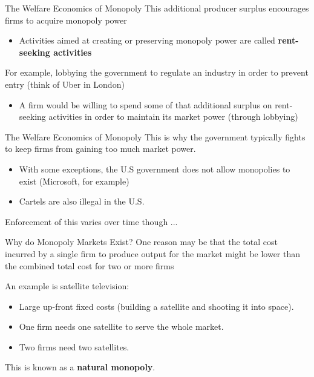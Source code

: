 \documentclass[11pt,t]{beamer}
\begin{document}
\begin{frame}{The Welfare Economics of Monopoly}
  This additional producer surplus encourages firms to acquire monopoly power

  \begin{itemize}
    \item Activities aimed at creating or preserving monopoly power are called \textbf{rent-seeking activities}
  \end{itemize}

  \bigskip\pause
  For example, lobbying the government to regulate an industry in order to prevent entry (think of Uber in London)

  \begin{itemize}
    \item A firm would be willing to spend some of that additional surplus on rent-seeking activities in order to maintain its market power (through lobbying)
  \end{itemize}
\end{frame}

\begin{frame}{The Welfare Economics of Monopoly}
  This is why the government typically fights to keep firms from gaining too much market power.
  \begin{itemize}
    \item With some exceptions, the U.S government does not allow monopolies to exist (Microsoft, for example)
    
    \item Cartels are also illegal in the U.S.
  \end{itemize}

  \bigskip Enforcement of this varies over time though ...
\end{frame}

\begin{frame}{Why do Monopoly Markets Exist?}
  One reason may be that the total cost incurred by a single firm to produce output for the market might be lower than the combined total cost for two or more firms
  
  \bigskip 
  An example is satellite television:
  \begin{itemize}
    \item Large up-front fixed costs (building a satellite and shooting it into space).
    \item One firm needs one satellite to serve the whole market.
    \item Two firms need two satellites.
  \end{itemize}

  \bigskip
  This is known as a \textbf{natural monopoly}.
\end{frame}
\end{document}
